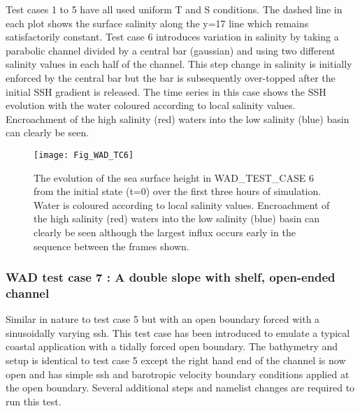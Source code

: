 Test cases 1 to 5 have all used uniform T and S conditions. The dashed line in each plot
shows the surface salinity along the y=17 line which remains satisfactorily constant. Test
case 6 introduces variation in salinity by taking a parabolic channel divided by a central
bar (gaussian) and using two different salinity values in each half of the channel. This
step change in salinity is initially enforced by the central bar but the bar is
subsequently over-topped after the initial SSH gradient is released. The time series in
this case shows the SSH evolution with the water coloured according to local salinity
values. Encroachment of the high salinity (red) waters into the low salinity (blue) basin
can clearly be seen.


\begin{figure}[htb] \begin{center}
\texttt{[image: Fig\_WAD\_TC6]}
\caption{ \label{Fig_WAD_TC6}
The evolution of the sea surface height in WAD\_TEST\_CASE 6 from the initial state (t=0)
over the first three hours of simulation. Water is coloured according to local salinity
values. Encroachment of the high salinity (red) waters into the low salinity (blue) basin
can clearly be seen although the largest influx occurs early in the sequence between the
frames shown.}
\end{center}\end{figure}

\clearpage
\subsubsection [WAD test case 7 : A double slope with shelf, open-ended channel ]
                    {WAD test case 7 : A double slope with shelf, open-ended channel}
\label{WAD_test_case7}

Similar in nature to test case 5 but with an open boundary forced with a sinusoidally
varying ssh. This test case has been introduced to emulate a typical coastal application
with a tidally forced open boundary. The bathymetry and setup is identical to test case 5
except the right hand end of the channel is now open and has simple ssh and barotropic
velocity boundary conditions applied at the open boundary. Several additional steps and
namelist changes are required to run this test.


